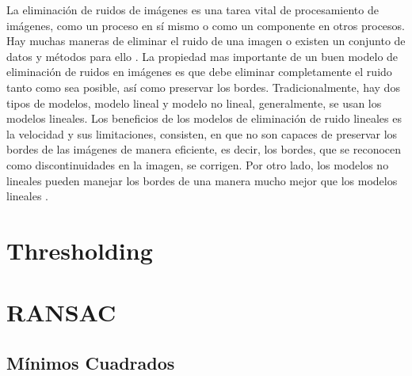La eliminación de ruidos de imágenes es una tarea vital de procesamiento de imágenes, como un proceso en sí mismo o como un componente en otros procesos. Hay muchas maneras de eliminar el ruido de una imagen o existen un conjunto de datos y métodos para ello \cite{PawanSumit}\cite{MandarMeghana}. La propiedad mas importante de un buen modelo de eliminación de ruidos en imágenes\cite{AjayBrijendra} es que debe eliminar completamente el ruido tanto como sea posible, así como preservar los bordes. Tradicionalmente, hay dos tipos de modelos, modelo lineal y modelo no lineal, generalmente, se usan los modelos lineales. Los beneficios de los modelos de eliminación de ruido lineales es la velocidad y sus limitaciones, consisten, en que no son capaces de preservar los bordes de las imágenes de manera eficiente, es decir, los bordes, que se reconocen como discontinuidades en la imagen, se corrigen. Por otro lado, los modelos no lineales pueden manejar los bordes de una manera mucho mejor que los modelos lineales \cite{PawanSumit}.

\section{Thresholding}



\section{RANSAC}



\subsection{Mínimos Cuadrados}
